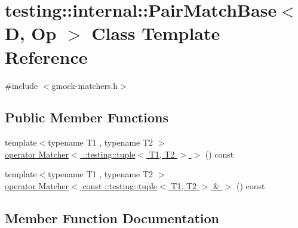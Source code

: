 \hypertarget{classtesting_1_1internal_1_1_pair_match_base}{}\section{testing\+:\+:internal\+:\+:Pair\+Match\+Base$<$ D, Op $>$ Class Template Reference}
\label{classtesting_1_1internal_1_1_pair_match_base}


{\ttfamily \#include $<$gmock-\/matchers.\+h$>$}

\subsection*{Public Member Functions}
\begin{DoxyCompactItemize}
\item 
{\footnotesize template$<$typename T1 , typename T2 $>$ }\\\hyperlink{classtesting_1_1internal_1_1_pair_match_base_a8f927cfe9008f7c35dcb03275bc69762}{operator Matcher$<$ \+::testing\+::tuple$<$ T1, T2 $>$ $>$} () const 
\item 
{\footnotesize template$<$typename T1 , typename T2 $>$ }\\\hyperlink{classtesting_1_1internal_1_1_pair_match_base_a51667d1fc49779ceff1bbf334bfe0470}{operator Matcher$<$ const \+::testing\+::tuple$<$ T1, T2 $>$ \& $>$} () const 
\end{DoxyCompactItemize}


\subsection{Member Function Documentation}
